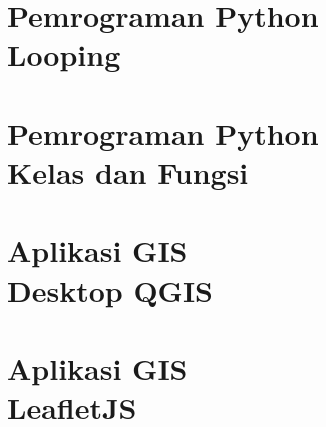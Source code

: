 \documentclass{WileySix}
\begin{document}
\chapter[Looping]
{Pemrograman Python\\ Looping}


\chapter[Kelas dan Fungsi]
{Pemrograman Python\\ Kelas dan Fungsi}



\chapter[QGIS]
{Aplikasi GIS\\ Desktop QGIS}


%

\chapter[LeafletJS]
{Aplikasi GIS\\ LeafletJS}









\printindex
\end{document}
